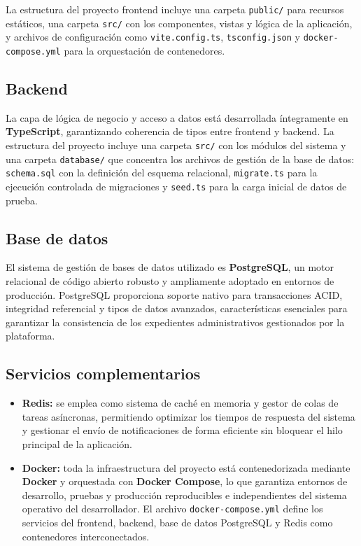 La estructura del proyecto frontend incluye una carpeta \texttt{public/} para recursos
estáticos, una carpeta \texttt{src/} con los componentes, vistas y lógica de la aplicación,
y archivos de configuración como \texttt{vite.config.ts}, \texttt{tsconfig.json} y
\texttt{docker-compose.yml} para la orquestación de contenedores.

\subsection*{Backend}

La capa de lógica de negocio y acceso a datos está desarrollada íntegramente en
\textbf{TypeScript}, garantizando coherencia de tipos entre frontend y backend. La estructura
del proyecto incluye una carpeta \texttt{src/} con los módulos del sistema y una carpeta
\texttt{database/} que concentra los archivos de gestión de la base de datos:
\texttt{schema.sql} con la definición del esquema relacional, \texttt{migrate.ts} para la
ejecución controlada de migraciones y \texttt{seed.ts} para la carga inicial de datos de
prueba.

\subsection*{Base de datos}

El sistema de gestión de bases de datos utilizado es \textbf{PostgreSQL}, un motor relacional
de código abierto robusto y ampliamente adoptado en entornos de producción. PostgreSQL
proporciona soporte nativo para transacciones ACID, integridad referencial y tipos de datos
avanzados, características esenciales para garantizar la consistencia de los expedientes
administrativos gestionados por la plataforma.

\subsection*{Servicios complementarios}

\begin{itemize}
    \item \textbf{Redis:} se emplea como sistema de caché en memoria y gestor de colas de
            tareas asíncronas, permitiendo optimizar los tiempos de respuesta del sistema y
            gestionar el envío de notificaciones de forma eficiente sin bloquear el hilo
            principal de la aplicación.
    \item \textbf{Docker:} toda la infraestructura del proyecto está contenedorizada mediante
            \textbf{Docker} y orquestada con \textbf{Docker Compose}, lo que garantiza entornos
            de desarrollo, pruebas y producción reproducibles e independientes del sistema
            operativo del desarrollador. El archivo \texttt{docker-compose.yml} define los
            servicios del frontend, backend, base de datos PostgreSQL y Redis como contenedores
            interconectados.
\end{itemize}

